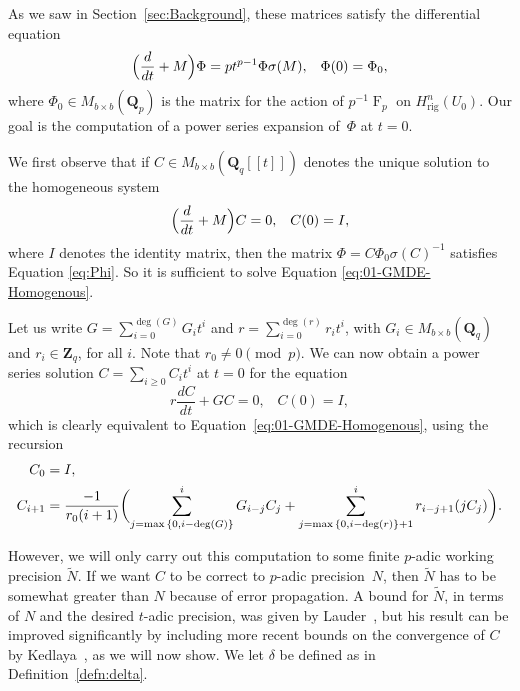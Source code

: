 \documentclass[a4paper,11pt]{article}
\numberwithin{equation}{section}
\newcommand{\ZZ}{\mathbf{Z}} %
\newcommand{\QQ}{\mathbf{Q}} %
\DeclareMathOperator{\Frob}{F}           %
\providecommand{\Hrig}{H_{\text{rig}}}  %
\theoremstyle{definition}
\begin{document}
As we saw in Section~\ref{sec:Background}, these matrices satisfy 
the differential equation
\begin{equation} \label{eq:Phi}
\Bigl(\frac{d}{dt} + M\Bigr) \Phi = p t^{p-1} \Phi \sigma(M), \;\;\; \Phi(0)=\Phi_0,
\end{equation}
where $\Phi_0 \in M_{b \times b}(\QQ_p)$ is the matrix for the action 
of $p^{-1} \Frob_p$ on $\Hrig^n(U_0)$. Our goal is the computation of 
a power series expansion of~$\Phi$ at $t=0$.

We first observe that if $C \in M_{b \times b}(\QQ_q[[t]])$ denotes 
the unique solution to the homogeneous system
\begin{equation} \label{eq:01-GMDE-Homogenous}
\Bigl(\frac{d}{dt} + M\Bigr) C = 0, \;\;\; C(0)=I,
\end{equation}
where $I$ denotes the identity matrix, then the matrix
$\Phi = C \Phi_0 \sigma(C)^{-1}$
satisfies Equation \eqref{eq:Phi}. So it is sufficient to solve Equation 
\eqref{eq:01-GMDE-Homogenous}.

Let us write $G = \sum_{i=0}^{\deg(G)} G_i t^i$ and $r= \sum_{i=0}^{\deg(r)} r_i t^i$,
with $G_i \in M_{b \times b}(\QQ_q)$ and $r_i \in \ZZ_q$, for all $i$. Note that
$r_0 \neq 0 \pmod{p}$.
We can now obtain a power series solution $C = \sum_{i \geq 0} C_i t^i$ at $t=0$ for 
the equation
\begin{equation*}
r \frac{dC}{dt} + G C = 0, \;\;\; C(0)=I,
\end{equation*}
which is clearly equivalent to Equation~\eqref{eq:01-GMDE-Homogenous}, 
using the recursion 
\begin{align}
C_0 &= I, \notag \\ 
C_{i+1} &= \frac{-1}{r_0 (i+1)} \biggl(
    \sum_{j=\max{\{0,i-\deg(G)\}}}^i G_{i-j} C_j + 
    \sum_{j=\max{\{0,i-\deg(r)\}}+1}^i r_{i-j+1} (j C_j) \biggr). \label{eq:recursiondifeq}
\end{align}

However, we will only carry out this computation to some finite $p$-adic 
working precision $\tilde{N}$. If we want $C$ to be correct to $p$-adic 
precision~$N$, then $\tilde{N}$ has to be somewhat greater than $N$ because 
of error propagation. A bound for $\tilde{N}$, in terms of $N$ and the 
desired $t$-adic precision, was given by Lauder~\citep[Theorem~5.1]{Lauder2006}, 
but his result can be improved significantly by including more recent bounds 
on the convergence of $C$ by Kedlaya~\citep{Kedlaya2010}, as we will now show. 
We let $\delta$ be defined as in Definition~\ref{defn:delta}. 
\end{document}
